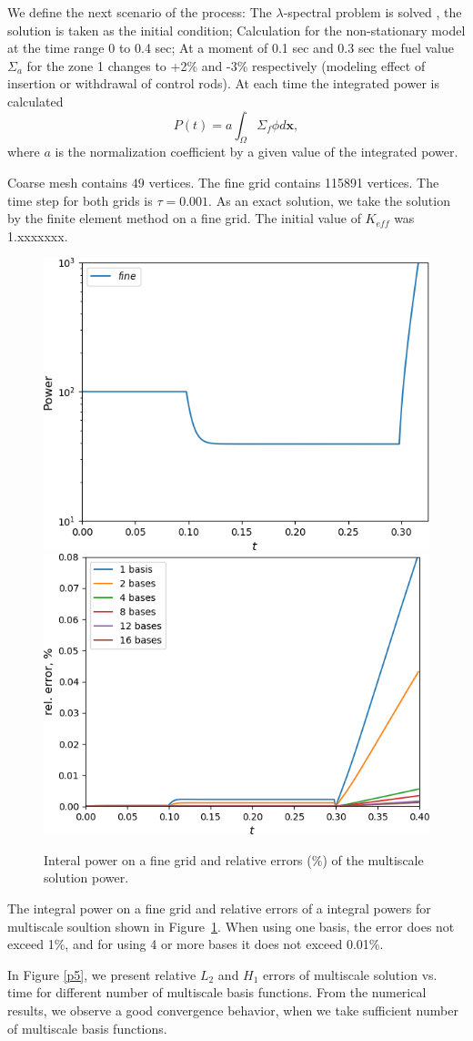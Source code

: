\documentclass[runningheads]{llncs}
\begin{document}
We define the next scenario of the process: The $\lambda$-spectral problem is solved \cite{Annals17}, the solution is taken as the initial condition; 
Calculation for the non-stationary model at the time range 0 to 0.4 sec;
At a moment of 0.1 sec and 0.3 sec the fuel value $\Sigma_a$ for the zone 1 changes to +2\% and -3\% respectively (modeling effect of insertion or withdrawal of control rods).
At each time the integrated power is calculated 
\[P(t) = a\int_{\Omega}\Sigma_f \phi d\bm x,\]
where $a$ is the normalization coefficient by a given value of the integrated power.

Coarse mesh contains $49$ vertices.
The fine grid contains 115891 vertices. 
The time step for both grids is $\tau = 0.001$.
As an exact solution, we take the solution by the finite element method on a fine grid.
The initial value of $K_{eff}$ was 1.xxxxxxx. 

\begin{figure}[h!]
\centering
\includegraphics[width=0.45\linewidth]{power_fine.png} 
\hspace{2em}
\includegraphics[width=0.45\linewidth]{power.png} 
\caption{Interal power on a fine grid and relative errors ($\%$) of the multiscale solution power.}
\label{p4}
\end{figure}
 
The integral power on a fine grid and relative errors of a integral powers for multiscale soultion shown in Figure~\ref{p4}. 
When using one basis, the error does not exceed 1\%, and for using 4 or more bases it does not exceed 0.01\%.

In Figure \ref{p5}, we present relative $L_2$ and $H_1$ errors of multiscale solution vs. time for different number of multiscale basis functions.
From the numerical results, we observe a good convergence behavior, when we take sufficient number of multiscale basis functions.
\end{document}
